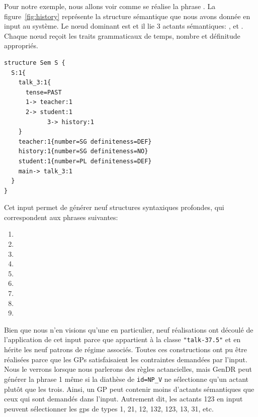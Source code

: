 Pour notre exemple, nous allons voir comme se réalise la phrase . La figure~\ref{fig:history} représente la structure sémantique que nous avons donnée en input au système. Le n\oe{}ud dominant est  et il lie 3 actants sémantiques: ,  et . Chaque n\oe{}ud reçoit les traits grammaticaux de temps, nombre et définitude appropriés.

\begin{lstlisting}[language=mate, caption=Structure sémantique de \form{The teacher talked about history to the students}, label=fig:history]
structure Sem S {
  S:1{
    talk_3:1{
      tense=PAST 
      1-> teacher:1
      2-> student:1
			3-> history:1
    }
    teacher:1{number=SG definiteness=DEF}
    history:1{number=SG definiteness=NO}
    student:1{number=PL definiteness=DEF}
    main-> talk_3:1
  }
}
\end{lstlisting}

Cet input permet de générer neuf structures syntaxiques profondes, qui correspondent aux phrases suivantes:

\begin{enumerate}
  \item {}
  \item {}
  \item {}
  \item {}
  \item {}
  \item {}
  \item {}
  \item {}
  \item {}
\end{enumerate}

Bien que nous n'en visions qu'une en particulier, neuf réalisations ont découlé de l'application de cet input parce que  appartient à la classe \texttt{"talk-37.5"} et en hérite les neuf patrons de régime associés. Toutes ces constructions ont pu être réalisées parce que les \acp{GP} satisfaisaient les contraintes demandées par l'input. Nous le verrons lorsque nous parlerons des règles actancielles, mais GenDR peut générer la phrase 1 même si la diathèse de \texttt{id=NP\_V} ne sélectionne qu'un actant plutôt que les trois. Ainsi, un \ac{GP} peut contenir moins d'actants sémantiques que ceux qui sont demandés dans l'input. Autrement dit, les actants 123 en input peuvent sélectionner les gps de types 1, 21, 12, 132, 123, 13, 31, etc. 

